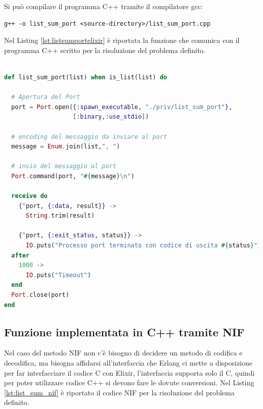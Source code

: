 Si può compilare il programma C++ tramite il compilatore gcc:
\begin{lstlisting}[language=none]
g++ -o list_sum_port <source-directory>/list_sum_port.cpp
\end{lstlisting}

Nel Listing \ref{lst:listsumportelixir} è riportata la funzione
che comunica con il programma C++ scritto per la risoluzione
del problema definito.

\begin{lstlisting}[language=elixir,captionpos=b,
	caption={Funzione list\_sum\_port()},
	label={lst:listsumportelixir}]

def list_sum_port(list) when is_list(list) do

  # Apertura del Port
  port = Port.open({:spawn_executable, "./priv/list_sum_port"},
                   [:binary,:use_stdio])

  # encoding del messaggio da inviare al port
  message = Enum.join(list,", ")

  # invio del messaggio al port
  Port.command(port, "#{message}\n")

  receive do
    {^port, {:data, result}} ->
      String.trim(result)

    {^port, {:exit_status, status}} ->
      IO.puts("Processo port terminato con codice di uscita #{status}")
  after
    1000 ->
      IO.puts("Timeout")
  end
  Port.close(port)
end
\end{lstlisting}

\subsection{Funzione implementata in C++ tramite NIF}

Nel caso del metodo NIF non c'è bisogno di decidere un
metodo di codifica e decodifica, ma bisogna affidarsi
all'interfaccia che Erlang ci mette a disposizione per
far interfacciare il codice C con Elixir, l'interfaccia
supporta solo il C, quindi per poter utilizzare codice C++
si devono fare le dovute conversioni.
Nel Listing \ref{lst:list_sum_nif} è riportato il codice
NIF per la risoluzione del problema definito.


